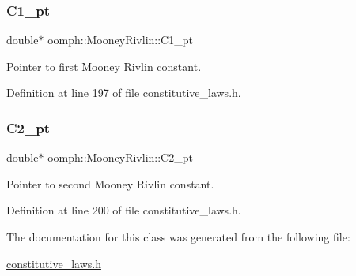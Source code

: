 \subsubsection{\texorpdfstring{C1\+\_\+pt}{C1\_pt}}
{\footnotesize\ttfamily double$\ast$ oomph\+::\+Mooney\+Rivlin\+::\+C1\+\_\+pt\hspace{0.3cm}{\ttfamily [private]}}



Pointer to first Mooney Rivlin constant. 



Definition at line 197 of file constitutive\+\_\+laws.\+h.

\mbox{\label{classoomph_1_1MooneyRivlin_a44b67554972b5659b5017598951be5fa}} 
\subsubsection{\texorpdfstring{C2\+\_\+pt}{C2\_pt}}
{\footnotesize\ttfamily double$\ast$ oomph\+::\+Mooney\+Rivlin\+::\+C2\+\_\+pt\hspace{0.3cm}{\ttfamily [private]}}



Pointer to second Mooney Rivlin constant. 



Definition at line 200 of file constitutive\+\_\+laws.\+h.



The documentation for this class was generated from the following file\+:\begin{DoxyCompactItemize}
\item 
\hyperlink{constitutive__laws_8h}{constitutive\+\_\+laws.\+h}\end{DoxyCompactItemize}
